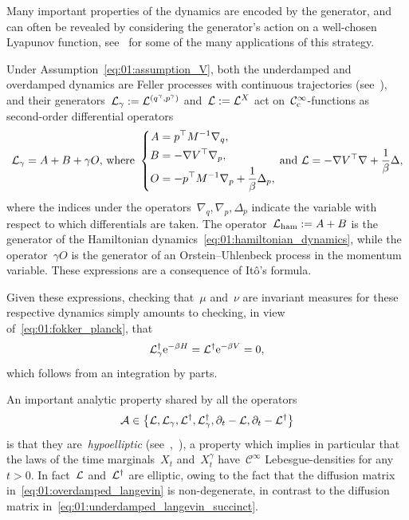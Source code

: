Many important properties of the dynamics are encoded by the generator, and can often be revealed by considering the generator's action on a well-chosen Lyapunov function, see~\cite{MSH02,RB06,HM11} for some of the many applications of this strategy.

Under Assumption~\ref{eq:01:assumption_V}, both the underdamped and overdamped dynamics are Feller processes with continuous trajectories (see~\cite[Theorem 3.5]{K12}), and their generators~$\mathcal{L}_{\gamma} := \mathcal{L}^{(q^\gamma,p^\gamma)}$ and~$\mathcal{L} := \mathcal{L}^{X}$ act on~$\mathcal{C}^\infty_{\mathrm{c}}$-functions as second-order differential operators
\begin{equation}
    \label{eq:01:generators}
    \mathcal{L}_{\gamma} = A + B + \gamma O,\,\text{where }\left\{\begin{aligned}
        A &= p^\top M^{-1}\nabla_q,\\
        B &= -\nabla V^\top \nabla_p,\\
        O &= -p^\top M^{-1}\nabla_p + \frac1\beta\Delta_p,
    \end{aligned}\right.\,\text{and }\mathcal{L} = -\nabla V^\top\nabla + \frac1\beta\Delta,
\end{equation}
where the indices under the operators~$\nabla_q,\nabla_p,\Delta_p$ indicate the variable with respect to which differentials are taken.
The operator~$\mathcal{L}_{\mathrm{ham}} := A+B$ is the generator of the Hamiltonian dynamics~\eqref{eq:01:hamiltonian_dynamics}, while the operator~$\gamma O$ is the generator of an Orstein--Uhlenbeck process in the momentum variable.
These expressions are a consequence of It\^o's formula.

Given these expressions, checking that~$\mu$ and~$\nu$ are invariant measures for these respective dynamics simply amounts to checking, in view of~\eqref{eq:01:fokker_planck}, that
\begin{equation}
    \label{eq:01:stationary_fokker_planck}
    \mathcal{L}_{\gamma}^\dagger \mathrm{e}^{-\beta H} = \mathcal{L}^\dagger \mathrm{e}^{-\beta V} = 0,
\end{equation}
which follows from an integration by parts.

An important analytic property shared by all the operators
$$\mathcal{A}\in \left\{\mathcal{L},\mathcal{L}_\gamma,\mathcal{L}^\dagger,\mathcal{L}_\gamma^\dagger,\partial_t-\mathcal{L},\partial_t-\mathcal{L}^\dagger\right\}$$
is that they are~\textit{hypoelliptic} (see~\cite{H67},~\cite[Section 7]{RB06}), a property which implies in particular that the laws of the time marginals~$X_t$ and~$X^\gamma_t$ have~$\mathcal C^\infty$ Lebesgue-densities for any~$t>0$.
In fact~$\mathcal{L}$ and~$\mathcal{L}^\dagger$ are elliptic, owing to the fact that the diffusion matrix in~\eqref{eq:01:overdamped_langevin} is non-degenerate, in contrast to the diffusion matrix in~\eqref{eq:01:underdamped_langevin_succinct}.


